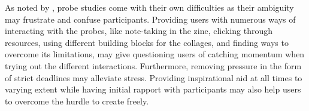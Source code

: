 As noted by \citeauthor{mattelmäki:2005}, probe studies come with their own difficulties as their ambiguity may frustrate and confuse participants. Providing users with numerous ways of interacting with the probes, like note-taking in the zine, clicking through resources, using different building blocks for the collages, and finding ways to overcome its limitations, may give questioning users of catching momentum when trying out the different interactions. Furthermore, removing pressure in the form of strict deadlines may alleviate stress. Providing inspirational aid at all times to varying extent while having initial rapport with participants may also help users to overcome the hurdle to create freely.